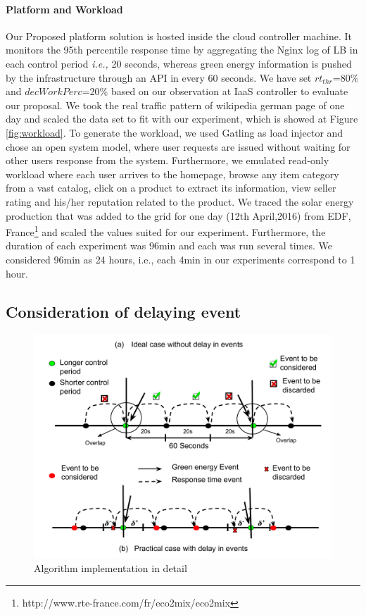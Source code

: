 \paragraph*{\textbf{Platform and Workload}} Our Proposed platform solution is hosted inside the cloud controller
machine. It monitors the 95th percentile response
time by aggregating the Nginx log of LB in each control period \emph{i.e.,} 20 seconds, whereas green energy
information is pushed by the infrastructure through an API in every 60 seconds. We have set $rt_{thr}$=80\% and $decWorkPerc$=20\% based on our observation at IaaS controller to evaluate our proposal. 
We took the real traffic pattern of wikipedia german page of one day \cite{soodeh} and scaled the data set to fit with our experiment,
which is showed at Figure \ref{fig:workload}. 
To generate the workload, we used Gatling as load injector and chose an
open system model, where user requests are issued without
waiting for other users response from the system. 
Furthermore,
we emulated read-only workload where each user arrives to the homepage, browse any item category from a
vast catalog, click on a product to extract its information,
view seller rating and his/her reputation related to the
product. 
We traced the solar energy production that was added to
the grid for one day (12th April,2016) from EDF,
France\footnote{http://www.rte-france.com/fr/eco2mix/eco2mix} and scaled the
values suited for our experiment.
Furthermore, the duration
of each experiment was 96min and each was run several
times. We considered 96min as 24 hours, i.e., each 4min in
our experiments correspond to 1 hour.


\subsection{Consideration of delaying event}

\begin{figure} [htb]
\includegraphics[scale=.35]{Graphs/implementation_UCC.pdf}
\caption{Algorithm implementation in detail}
\label{fig:implementation} 
\end{figure}

